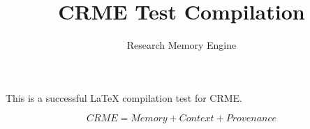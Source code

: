 \documentclass{article}
\title{CRME Test Compilation}
\author{Research Memory Engine}
\begin{document}
\maketitle

This is a successful LaTeX compilation test for CRME.

\[
CRME = Memory + Context + Provenance
\]
\end{document}
